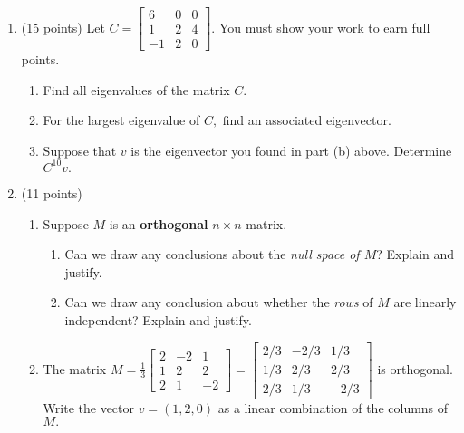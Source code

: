 \documentclass[11pt,fleqn]{article}
\begin{document}
\begin{enumerate}
\item (15 points) Let $C=\begin{bmatrix}6&0&0\\1&2&4\\-1&2&0 \end{bmatrix}.$ You must show your work to earn full points.
	\begin{enumerate}
	\item Find all eigenvalues of the matrix $C.$
	\vfill
	\item For the largest eigenvalue of $C,$ find an associated eigenvector.
	\vfill
	\item Suppose that $v$ is the eigenvector you found in part (b) above. Determine $C^{10}v.$
	\vspace{1in}
	\end{enumerate}
\newpage
\item (11 points)
	\begin{enumerate}
	\item Suppose $M$ is an \textbf{orthogonal} $n\times n$ matrix.
		\begin{enumerate}
		\item Can we draw any conclusions about the \emph{null space of $M$}? Explain and justify.
		\vfill
		\item Can we draw any conclusion about whether the \emph{rows} of $M$ are linearly independent? Explain and justify.
		\vfill
		\end{enumerate}
	\item The matrix $M=\frac{1}{3}\begin{bmatrix} 2&-2&1\\ 1&2&2\\2&1&-2\end{bmatrix}=\begin{bmatrix} 2/3&-2/3&1/3\\ 1/3&2/3&2/3\\2/3&1/3&-2/3\end{bmatrix}$ is orthogonal. Write the vector $v=(1,2,0)$ as a linear combination of the columns of $M.$
	\end{enumerate}


\end{enumerate}
\end{document}
